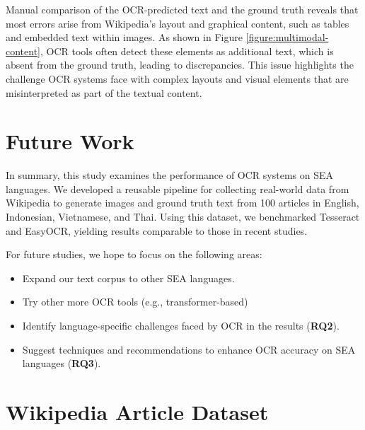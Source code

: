\documentclass[12pt,oneside]{memoir}
\begin{document}
Manual comparison of the OCR-predicted text and the ground truth reveals that most 
errors arise from Wikipedia’s layout and graphical content, such as 
tables and embedded text within images. As shown in Figure \ref{figure:multimodal-content}, 
OCR tools often detect these elements as additional text, which is absent from 
the ground truth, leading to discrepancies. This issue highlights the challenge 
OCR systems face with complex layouts and visual elements that are 
misinterpreted as part of the textual content.

\chapter{Future Work}
In summary, this study examines the performance of OCR systems on SEA languages. 
We developed a reusable pipeline for collecting real-world data from Wikipedia 
to generate images and ground truth text from 100 articles in English, 
Indonesian, Vietnamese, and Thai. Using this dataset, we benchmarked Tesseract 
and EasyOCR, yielding results comparable to those in recent studies.

For future studies, we hope to focus on the following areas:

\begin{itemize}
    \item Expand our text corpus to other SEA languages.
    \item Try other more OCR tools (e.g., transformer-based)
    \item Identify language-specific challenges faced by OCR in the results (\textbf{RQ2}).
    \item Suggest techniques and recommendations to enhance OCR accuracy on SEA languages (\textbf{RQ3}).
\end{itemize}

\printbibliography[title={References}]

\clearpage
\appendix
\renewcommand{\chaptername}{Appendix}

\chapter{Wikipedia Article Dataset}
\end{document}
